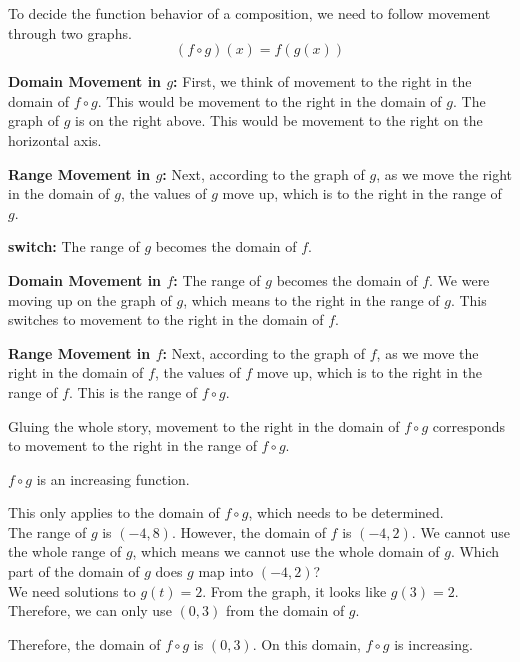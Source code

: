 \documentclass{ximera}
\begin{document}
To decide the function behavior of a composition, we need to follow movement through two graphs. \\



\[
(f \circ g)(x) = f(g(x))
\]



\textbf{\textcolor{blue!55!black}{Domain Movement in $g$:}}  First, we think of movement to the right in the domain of $f \circ g$.  This would be movement to the right in the domain of $g$.  The graph of $g$ is on the right above.  This would be movement to the right on the horizontal axis.



\textbf{\textcolor{blue!55!black}{Range Movement in $g$:}}  Next, according to the graph of $g$, as we move the right in the domain of $g$, the values of $g$ move up, which is to the right in the range of $g$.




\textbf{\textcolor{blue!55!black}{switch:}}   The range of $g$ becomes the domain of $f$.  


\textbf{\textcolor{blue!55!black}{Domain Movement in $f$:}}   The range of $g$ becomes the domain of $f$.  We were moving up on the graph of $g$, which means to the right in the range of $g$.  This switches to movement to the right in the domain of $f$.


\textbf{\textcolor{blue!55!black}{Range Movement in $f$:}}  Next, according to the graph of $f$, as we move the right in the domain of $f$, the values of $f$ move up, which is to the right in the range of $f$.  This is the range of $f \circ g$.




Gluing the whole story, movement to the right in the domain of $f \circ g$ corresponds to movement to the right in the range of $f \circ g$.

$f \circ g$ is an increasing function.



\begin{observation}


This only applies to the domain of $f \circ g$, which needs to be determined. \\



The range of $g$ is $(-4, 8)$.  However, the domain of $f$ is $(-4, 2)$.   We cannot use the whole range of $g$, which means we cannot use the whole domain of $g$.  Which part of the domain of $g$ does $g$ map into $(-4, 2)$? \\


We need solutions to $g(t) = 2$.  From the graph, it looks like $g(3) = 2$.  Therefore, we can only use $(0, 3)$ from the domain of $g$.


Therefore, the domain of $f \circ g$ is $(0, 3)$.  On this domain, $f \circ g$ is increasing.



\end{observation}
\end{document}
